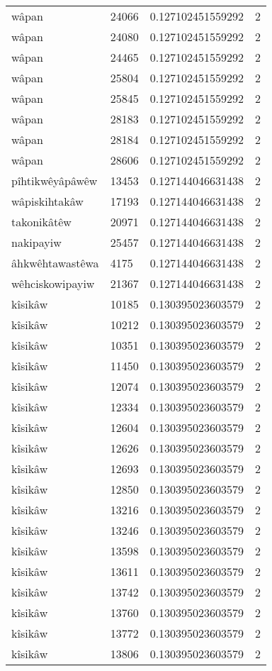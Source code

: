 \begin{longtable}{llll}
wâpan & 24066 & 0.127102451559292 & 2 \\
wâpan & 24080 & 0.127102451559292 & 2 \\
wâpan & 24465 & 0.127102451559292 & 2 \\
wâpan & 25804 & 0.127102451559292 & 2 \\
wâpan & 25845 & 0.127102451559292 & 2 \\
wâpan & 28183 & 0.127102451559292 & 2 \\
wâpan & 28184 & 0.127102451559292 & 2 \\
wâpan & 28606 & 0.127102451559292 & 2 \\
pîhtikwêyâpâwêw & 13453 & 0.127144046631438 & 2 \\
wâpiskihtakâw & 17193 & 0.127144046631438 & 2 \\
takonikâtêw & 20971 & 0.127144046631438 & 2 \\
nakipayiw & 25457 & 0.127144046631438 & 2 \\
âhkwêhtawastêwa & 4175 & 0.127144046631438 & 2 \\
wêhciskowipayiw & 21367 & 0.127144046631438 & 2 \\
kîsikâw & 10185 & 0.130395023603579 & 2 \\
kîsikâw & 10212 & 0.130395023603579 & 2 \\
kîsikâw & 10351 & 0.130395023603579 & 2 \\
kîsikâw & 11450 & 0.130395023603579 & 2 \\
kîsikâw & 12074 & 0.130395023603579 & 2 \\
kîsikâw & 12334 & 0.130395023603579 & 2 \\
kîsikâw & 12604 & 0.130395023603579 & 2 \\
kîsikâw & 12626 & 0.130395023603579 & 2 \\
kîsikâw & 12693 & 0.130395023603579 & 2 \\
kîsikâw & 12850 & 0.130395023603579 & 2 \\
kîsikâw & 13216 & 0.130395023603579 & 2 \\
kîsikâw & 13246 & 0.130395023603579 & 2 \\
kîsikâw & 13598 & 0.130395023603579 & 2 \\
kîsikâw & 13611 & 0.130395023603579 & 2 \\
kîsikâw & 13742 & 0.130395023603579 & 2 \\
kîsikâw & 13760 & 0.130395023603579 & 2 \\
kîsikâw & 13772 & 0.130395023603579 & 2 \\
kîsikâw & 13806 & 0.130395023603579 & 2 \\

\end{longtable}
